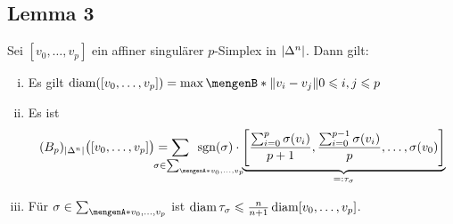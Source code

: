 \subsection[Lemma 3: Eigenschaften von affinen singulären Simplizes]{Lemma 3} %
\label{sub:1316}
Sei $[v_0, \ldots , v_p]$ ein affiner singulärer $p$-Simplex in $\abs*{\Delta^n}$. Dann gilt:
\begin{enumerate}[(i)]
	\item Es gilt $\diam \enbrace*{[v_0, \ldots ,v_p]}= \max \set[\norm{v_i - v_j} ]{0 \le i,j\le p\rule{0cm}{0.9em}}$
	\item Es ist 
	\[
		(B_p)_{\abs*{\Delta^n}} \enbrace[\big]{[v_0, \ldots ,v_p]} =
		\smashoperator{\sum_{\hspace{3em}\sigma \in \sum_{\set{v_0,\ldots ,v_p}}}}
		\enspace\sgn(\sigma)  \cdot  
		\underbrace{\benbrace*{\frac{\sum_{i=0}^{p} \sigma(v_i)}{p+1}, \frac{\sum_{i=0}^{p-1} \sigma(v_i)}{p} ,\ldots , \sigma(v_0)  } }_{=: \tau_\sigma}
	\]
	\item Für $\sigma \in \sum_{\set{v_0, \ldots ,v_p}}$ ist $\diam \tau_\sigma \le \frac{n}{n+1} \diam [v_0,\ldots ,v_p]$.
\end{enumerate}
